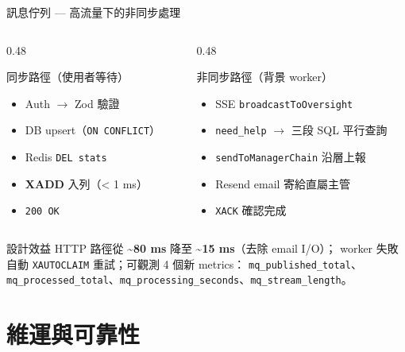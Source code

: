 \documentclass[aspectratio=169,12pt]{beamer}
\begin{document}
\begin{frame}[shrink=10]{訊息佇列 — 高流量下的非同步處理}
\begin{columns}[T,onlytextwidth]
\begin{column}{0.48\textwidth}
  \begin{block}{同步路徑（使用者等待）}
    \begin{itemize}\small
      \item Auth $\rightarrow$ Zod 驗證
      \item DB upsert（\texttt{ON CONFLICT}）
      \item Redis \texttt{DEL stats}
      \item \textbf{XADD} 入列（< 1 ms）
      \item \texttt{200 OK}
    \end{itemize}
  \end{block}
\end{column}
\begin{column}{0.48\textwidth}
  \begin{block}{非同步路徑（背景 worker）}
    \begin{itemize}\small
      \item SSE \texttt{broadcastToOversight}
      \item \texttt{need\_help} $\rightarrow$ 三段 SQL 平行查詢
      \item \texttt{sendToManagerChain} 沿層上報
      \item Resend email 寄給直屬主管
      \item \texttt{XACK} 確認完成
    \end{itemize}
  \end{block}
\end{column}
\end{columns}

\begin{exampleblock}{設計效益}
\small
HTTP 路徑從 \textbf{\textasciitilde{}80 ms} 降至 \textbf{\textasciitilde{}15 ms}（去除 email I/O）；
worker 失敗自動 \texttt{XAUTOCLAIM} 重試；可觀測 4 個新 metrics：
\texttt{mq\_published\_total}、\texttt{mq\_processed\_total}、\texttt{mq\_processing\_seconds}、\texttt{mq\_stream\_length}。
\end{exampleblock}
\end{frame}

\section{維運與可靠性}
\end{document}
